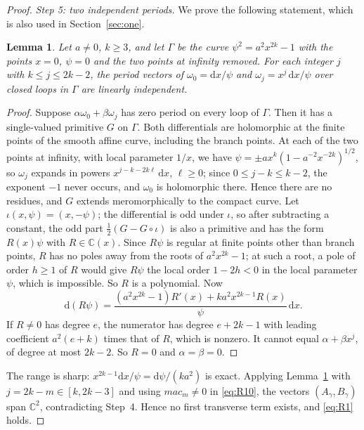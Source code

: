 \documentclass[11pt]{article}
\numberwithin{equation}{section}
\newtheorem{lemma}[theorem]{Lemma}
\theoremstyle{definition}
\theoremstyle{remark}
\newcommand{\C}{\mathbb C}
\newcommand{\dd}{\mathrm d}
\begin{document}
\begin{proof}
\emph{Step 5: two independent periods.} We prove the following statement, which is also used in
Section~\ref{sec:one}.

\begin{lemma}\label{lem:periods}
Let $a\ne0$, $k\ge3$, and let $\Gamma$ be the curve $\psi^2=a^2x^{2k}-1$ with the points $x=0$, $\psi=0$ and the two
points at infinity removed. For each integer $j$ with $k\le j\le 2k-2$, the period vectors of
$\omega_0=\dd x/\psi$ and $\omega_j=x^j\,\dd x/\psi$ over closed loops in $\Gamma$ are linearly independent.
\end{lemma}

\begin{proof}
Suppose $\alpha\omega_0+\beta\omega_j$ has zero period on every loop of $\Gamma$. Then it has a single-valued
primitive $G$ on $\Gamma$. Both differentials are holomorphic at the finite points of the smooth affine curve,
including the branch points. At each of the two points at infinity, with local parameter $1/x$, we have
$\psi=\pm a x^k(1-a^{-2}x^{-2k})^{1/2}$, so $\omega_j$ expands in powers $x^{j-k-2k\ell}\,\dd x$, $\ell\ge0$; since
$0\le j-k\le k-2$, the exponent $-1$ never occurs, and $\omega_0$ is holomorphic there. Hence there are no residues,
and $G$ extends meromorphically to the compact curve. Let $\iota(x,\psi)=(x,-\psi)$; the differential is odd under
$\iota$, so after subtracting a constant, the odd part $\tfrac12(G-G\circ\iota)$ is also a primitive and has the form
$R(x)\psi$ with $R\in\C(x)$. Since $R\psi$ is regular at finite points other than branch points, $R$ has no poles away
from the roots of $a^2x^{2k}-1$; at such a root, a pole of order $h\ge1$ of $R$ would give $R\psi$ the local order
$1-2h<0$ in the local parameter $\psi$, which is impossible. So $R$ is a polynomial. Now
\begin{equation}\label{eq:R15}
\dd(R\psi)=\frac{(a^2x^{2k}-1)R'(x)+k a^2x^{2k-1}R(x)}{\psi}\,\dd x .
\end{equation}
If $R\ne0$ has degree $e$, the numerator has degree $e+2k-1$ with leading coefficient $a^2(e+k)$ times that of $R$,
which is nonzero. It cannot equal $\alpha+\beta x^j$, of degree at most $2k-2$. So $R=0$ and $\alpha=\beta=0$.
\end{proof}

The range is sharp: $x^{2k-1}\dd x/\psi=\dd\psi/(ka^2)$ is exact. Applying Lemma~\ref{lem:periods} with
$j=2k-m\in[k,2k-3]$ and using $mac_m\ne0$ in \eqref{eq:R10}, the vectors $(A_\gamma,B_\gamma)$ span $\C^2$,
contradicting Step~4. Hence no first transverse term exists, and \eqref{eq:R1} holds.
\end{proof}
\end{document}
